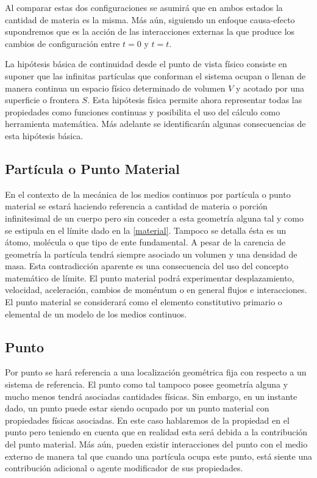 \documentclass[../notas medios.tex]{subfiles}
\begin{document}
Al comparar estas dos configuraciones se asumirá que en ambos estados la
cantidad de materia es la misma.  Más aún, siguiendo un enfoque causa-efecto supondremos que es la acción de las interacciones externas la que produce los cambios de configuración entre $t=0$ y $t=t$.

La hipótesis básica de continuidad desde el punto de vista físico consiste en suponer que las infinitas partículas que conforman el sistema ocupan o llenan de manera continua un espacio físico determinado de volumen $V$ y acotado por una superficie o frontera $S$.  Esta hipótesis física permite ahora representar todas las propiedades como funciones continuas y posibilita el uso del cálculo como herramienta matemática.  Más adelante se identificarán algunas consecuencias de esta hipótesis básica.


\subsection{Partícula o Punto Material}
En el contexto de la mecánica de los medios continuos por partícula o punto 
material se estará haciendo referencia a cantidad de materia o porción 
infinitesimal de un cuerpo pero sin conceder a esta geometría alguna tal y como 
se estipula en el límite dado en la \cref{material}.  Tampoco se detalla ésta 
es un átomo, molécula o que tipo de ente fundamental.  A pesar de la carencia 
de geometría la partícula tendrá siempre asociado un volumen y una densidad de 
masa.  Esta contradicción aparente es una consecuencia del uso del concepto 
matemático de límite.  El punto material podrá experimentar desplazamiento, 
velocidad, aceleración, cambios de moméntum o en general flujos e 
interacciones.  El punto material se considerará como el elemento constitutivo 
primario o elemental de un modelo de los medios continuos.

\subsection{Punto}
Por punto se hará referencia a una localización geométrica fija con respecto a un sistema de referencia.  El punto como tal tampoco posee geometría alguna y mucho menos tendrá asociadas cantidades físicas.  Sin embargo, en un instante dado, un punto puede estar siendo ocupado por un punto material con propiedades físicas asociadas.  En este caso hablaremos de la propiedad en el punto pero teniendo en cuenta que en realidad esta será debida a la contribución del punto material.  Más aún, pueden existir interacciones del punto con el medio externo de manera tal que cuando una partícula ocupa este punto, está siente una contribución adicional o agente modificador de sus propiedades.
\end{document}
